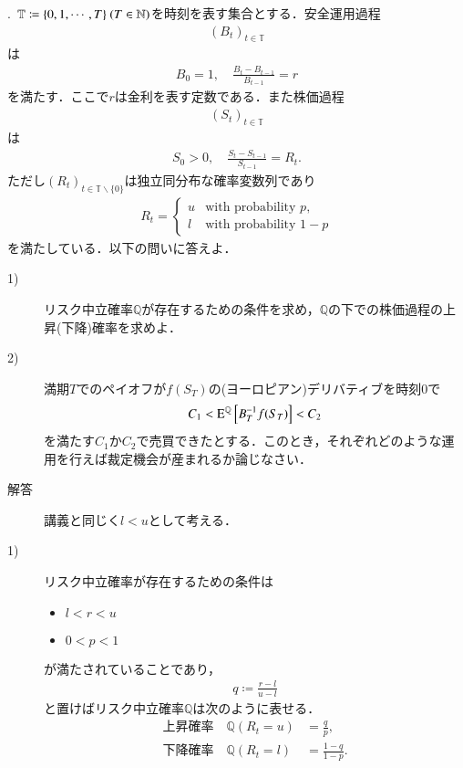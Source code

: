 .\ $\mathbb{T} \coloneqq \{0, 1, \cdots,T\}\ (T \in \N)$を時刻を表す集合とする．安全運用過程
\begin{align}
	(B_t)_{t \in \mathbb{T}}
\end{align}
は
\begin{align}
	B_0 = 1, \quad \frac{B_t - B_{t-1}}{B_{t-1}} = r
\end{align}
を満たす．ここで$r$は金利を表す定数である．また株価過程
\begin{align}
	(S_t)_{t \in \mathbb{T}}
\end{align}
は
\begin{align}
	S_0 > 0, \quad \frac{S_t - S_{t-1}}{S_{t-1}} = R_t.
\end{align}
ただし$(R_t)_{t \in \mathbb{T}\backslash \{0\}}$は独立同分布な確率変数列であり
\begin{align}
	R_t = \begin{cases}
		u & \mbox{with probability } p, \\
		l & \mbox{with probability } 1-p
	\end{cases}
\end{align}
を満たしている．以下の問いに答えよ．
\begin{description}
	\item[1)] リスク中立確率$\mathbb{Q}$が存在するための条件を求め，$\mathbb{Q}$の下での株価過程の上昇(下降)確率を求めよ．
	\item[2)] 満期$T$でのペイオフが$f(S_T)$の(ヨーロピアン)デリバティブを時刻0で
		\begin{align}
			C_1 < \Exp{B_T^{-1}f(S_T)}{}{\mathbb{Q}} < C_2
		\end{align}
		を満たす$C_1$か$C_2$で売買できたとする．このとき，それぞれどのような運用を行えば裁定機会が産まれるか論じなさい．
\end{description}

\begin{description}
\item[解答] 講義と同じく$l < u$として考える．
\item[1)] リスク中立確率が存在するための条件は
	\begin{itemize}
		\item $ l < r < u$
		\item $ 0 < p < 1$
	\end{itemize}
	が満たされていることであり，
	\begin{align}
		q \coloneqq \frac{r - l}{u - l}
	\end{align}
	と置けばリスク中立確率$\mathbb{Q}$は次のように表せる．
	\begin{align}
		\mbox{上昇確率} \quad \mathbb{Q}(R_t = u) &= \frac{q}{p}, \\
		\mbox{下降確率} \quad \mathbb{Q}(R_t = l) &= \frac{1-q}{1 - p}.
	\end{align}
\end{description}

